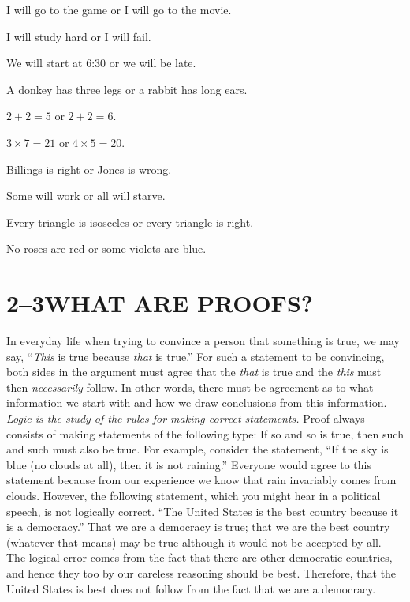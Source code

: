 \documentclass[11pt]{book}
\theoremstyle{bkplain}
\theoremstyle{XIplainnote}
\theoremstyle{bkplain}
\theoremstyle{bkplain}
\begin{document}
\begin{exercisecols}
\begin{exlist}
\item I will go to the game or I will go to the movie.
\item I will study hard or I will fail.
\item We will start at 6:30 or we will be late.
\item A donkey has three legs or a rabbit has long ears.
\item $2 + 2 = 5$ or $2 + 2 = 6$.
\item $3 \times 7 = 21$ or $4 \times 5 = 20$.
\item Billings is right or Jones is wrong.
\item[\stex 8.] Some will work or all will starve.
\item[\stex 9.] Every triangle is isosceles or every triangle is right.
\item[\stex 10.] No roses are red or some violets are blue.
\end{exlist}
\end{exercisecols}

\section*{2--3\quad WHAT ARE PROOFS?}

In everyday life when trying to convince a person that something is true, we may
say, ``\emph{This} is true because \emph{that} is true.'' For such a statement to
be convincing, both sides in the argument must agree that the \emph{that} is true
and the \emph{this} must then \emph{necessarily} follow. In other words, there
must be agreement as to what information we start with and how we draw
conclusions from this information. \emph{Logic is the study of the rules for
making correct statements.} Proof always consists of making statements of the
following type: If so and so is true, then such and such must also be true. For
example, consider the statement, ``If the sky is blue (no clouds at all), then it
is not raining.'' Everyone would agree to this statement because from our
experience we know that rain invariably comes from clouds. However, the following
statement, which you might hear in a political speech, is not logically correct.
``The United States is the best country because it is a democracy.'' That we are a
democracy is true; that we are the best country (whatever that means) may be true
although it would not be accepted by all. The logical error comes from the fact
that there are other democratic countries, and hence they too by our careless
reasoning should be best. Therefore, that the United States is best does not
follow from the fact that we are a democracy.
\end{document}
